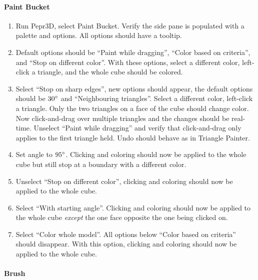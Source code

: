 \paragraph{Paint Bucket}

\begin{enumerate}
\item Run Pepr3D, select Paint Bucket. Verify the side pane is populated with a palette and options. All options should have a tooltip.
\item Default options should be ``Paint while dragging'', ``Color based on criteria'', and ``Stop on different color''. With these options, select a different color, left-click a triangle, and the whole cube should be colored.
\item Select ``Stop on sharp edges'', new options should appear, the default options should be $30\degree$ and ``Neighbouring triangles''. Select a different color, left-click a triangle. Only the two triangles on a face of the cube should change color. Now click-and-drag over multiple triangles and the changes should be real-time. Unselect ``Paint while dragging'' and verify that click-and-drag only applies to the first triangle held. Undo should behave as in Triangle Painter.
\item Set angle to $95\degree$. Clicking and coloring should now be applied to the whole cube but still stop at a boundary with a different color.
\item Unselect ``Stop on different color'', clicking and coloring should now be applied to the whole cube.
\item Select ``With starting angle''. Clicking and coloring should now be applied to the whole cube \emph{except} the one face opposite the one being clicked on.
\item Select ``Color whole model''. All options below ``Color based on criteria'' should disappear. With this option, clicking and coloring should now be applied to the whole cube.
\end{enumerate}

\paragraph{Brush}

